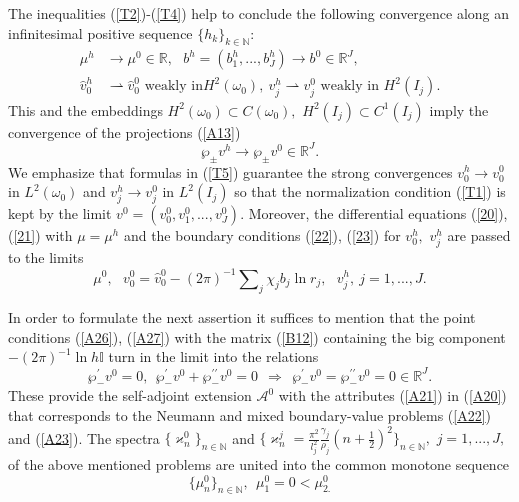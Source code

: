 \documentclass[11pt]{article}%
\numberwithin{equation}{section}
\begin{document}
The inequalities (\ref{T2})-(\ref{T4}) help to conclude the following
convergence along an infinitesimal positive sequence $\{h_{k}\}_{k\in
\mathbb{N}}$:%
\begin{align}
\mu^{h}  &  \rightarrow\mu^{0}\in\mathbb{R},\ \ \ b^{h}=(b_{1}^{h}%
,...,b_{J}^{h})\rightarrow b^{0}\in\mathbb{R}^{J},\ \label{T5}\\
\widehat{v}_{0}^{h}  &  \rightharpoonup\widehat{v}_{0}^{0}\text{ weakly in
}H^{2}(\omega_{0}),\ v_{j}^{h}\rightharpoonup v_{j}^{0}\text{ weakly in }%
H^{2}(I_{j}).\nonumber
\end{align}
This and the embeddings $H^{2}(\omega_{0})\subset C(\omega_{0}),$ $H^{2}%
(I_{j})\subset C^{1}(I_{j})$ imply the convergence of the projections
(\ref{A13})%
\begin{equation}
\wp_{\pm}v^{h}\rightarrow\wp_{\pm}v^{0}\in\mathbb{R}^{J}. \label{T6}%
\end{equation}
We emphasize that formulas in (\ref{T5}) guarantee the strong convergences
$v_{0}^{h}\rightarrow v_{0}^{0}$ in $L^{2}(\omega_{0})$ and $v_{j}%
^{h}\rightarrow v_{j}^{0}$ in $L^{2}(I_{j})$ so that the normalization
condition (\ref{T1}) is kept by the limit $v^{0}=(v_{0}^{0},v_{1}%
^{0},...,v_{J}^{0})$. Moreover, the differential equations (\ref{20}),
(\ref{21}) with $\mu=\mu^{h}$ and the boundary conditions (\ref{22}),
(\ref{23}) for $v_{0}^{h},$ $v_{j}^{h}$ are passed to the limits%
\begin{equation}
\mu^{0},\ \ \ v_{0}^{0}=\widehat{v}_{0}^{0}-(2\pi)^{-1}%
{\textstyle\sum\nolimits_{j}}
\chi_{j}b_{j}\ln r_{j},\text{ \ \ }v_{j}^{h},\ j=1,...,J. \label{T7}%
\end{equation}


In order to formulate the next assertion it suffices to mention that the point
conditions (\ref{A26}), (\ref{A27}) with the matrix (\ref{B12}) containing the
big component $-(2\pi)^{-1}\ln h\mathbb{I}$ turn in the limit into the
relations%
\begin{equation}
\wp_{-}^{\prime}v^{0}=0,\ \ \wp_{-}^{\prime}v^{0}+\wp_{-}^{\prime\prime}%
v^{0}=0\ \ \Rightarrow\ \ \wp_{-}^{\prime}v^{0}=\wp_{-}^{\prime\prime}%
v^{0}=0\in\mathbb{R}^{J}. \label{T8}%
\end{equation}
These provide the self-adjoint extension $\mathcal{A}^{0}$ with the attributes
(\ref{A21}) in (\ref{A20}) that corresponds to the Neumann and mixed
boundary-value problems (\ref{A22}) and (\ref{A23}). The spectra
$\{\varkappa_{n}^{0}\}_{n\in\mathbb{N}}$ and $\{\varkappa_{n}^{j}=\frac
{\pi^{2}}{l_{j}^{2}}\frac{\gamma_{j}}{\rho_{j}}(n+\frac{1}{2})^{2}%
\}_{n\in\mathbb{N}},$ $j=1,...,J,$ of the above mentioned problems are united
into the common monotone sequence%
\begin{equation}
\{\mu_{n}^{0}\}_{n\in\mathbb{N}},\ \ \mu_{1}^{0}=0<\mu_{2.}^{0} \label{T9}%
\end{equation}
\end{document}
